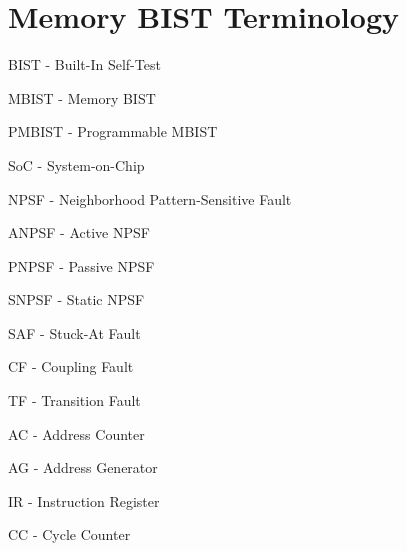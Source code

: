 \section{Memory BIST Terminology}
\label{sect:int-terminology}
BIST - Built-In Self-Test

MBIST - Memory BIST

PMBIST - Programmable MBIST

SoC - System-on-Chip

NPSF - Neighborhood Pattern-Sensitive Fault

ANPSF - Active NPSF

PNPSF - Passive NPSF

SNPSF - Static NPSF

SAF - Stuck-At Fault

CF - Coupling Fault

TF - Transition Fault

AC - Address Counter

AG - Address Generator

IR - Instruction Register

CC - Cycle Counter
